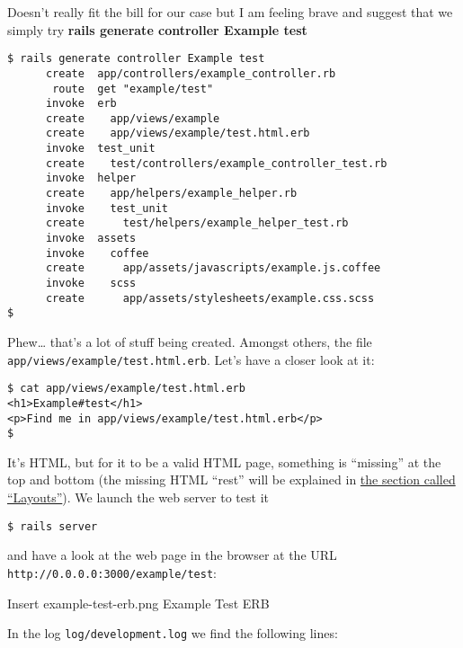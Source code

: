 \documentclass[a4paper]{book}
\begin{document}
Doesn't really fit the bill for our case but I am feeling brave and suggest that we simply try \textbf{rails generate controller Example test}

\begin{shaded}\begin{verbatim}
$ rails generate controller Example test
      create  app/controllers/example_controller.rb
       route  get "example/test"
      invoke  erb
      create    app/views/example
      create    app/views/example/test.html.erb
      invoke  test_unit
      create    test/controllers/example_controller_test.rb
      invoke  helper
      create    app/helpers/example_helper.rb
      invoke    test_unit
      create      test/helpers/example_helper_test.rb
      invoke  assets
      invoke    coffee
      create      app/assets/javascripts/example.js.coffee
      invoke    scss
      create      app/assets/stylesheets/example.css.scss
$
\end{verbatim}\end{shaded}

Phew\ldots{} that's a lot of stuff being created. Amongst others, the file \texttt{app/views/example/test.html.erb}. Let's have a closer look at it:

\begin{shaded}\begin{verbatim}
$ cat app/views/example/test.html.erb
<h1>Example#test</h1>
<p>Find me in app/views/example/test.html.erb</p>
$
\end{verbatim}\end{shaded}

It's HTML, but for it to be a valid HTML page, something is “missing” at the top and bottom (the missing HTML “rest” will be explained in \hyperref[erbux5flayouts]{the section called “Layouts”}). We launch the web server to test it

\begin{shaded}\begin{verbatim}
$ rails server
\end{verbatim}\end{shaded}

and have a look at the web page in the browser at the URL \texttt{http://0.0.0.0:3000/example/test}:

Insert example-test-erb.png Example Test ERB

In the log \texttt{log/development.log} we find the following lines:
\end{document}

